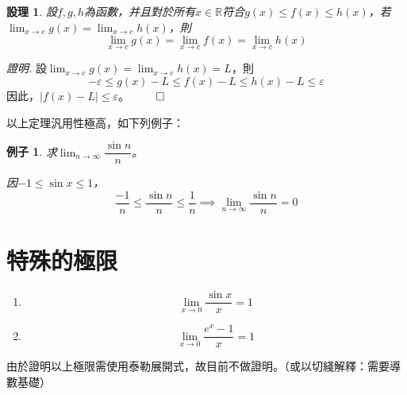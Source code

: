 \documentclass[12pt]{article}
\newtheorem*{proposition}{設理}
\newtheorem*{example}{例子}
\renewenvironment*{proof}{\textit{證明.}}{\hfill$\qed$}
\begin{document}
    \begin{proposition}
        設$f,g,h$為函數，并且對於所有$x\in\mathbb{R}$符合$g(x)\leq f(x)\leq h(x)$，若$\displaystyle \lim_{x\to c}g(x)=\lim_{x\to c}h(x)$，則$$\lim_{x\to c}g(x)=\lim_{x\to c}f(x)=\lim_{x\to c}h(x)$$
    \end{proposition}

    \begin{proof}
        設$\displaystyle \lim_{x\to c}g(x)=\lim_{x\to c}h(x)=L$，則$$-\varepsilon\leq g(x)-L\leq f(x)-L\leq h(x)-L\leq \varepsilon$$
        因此，$|f(x)-L|\leq \varepsilon$。
    \end{proof}

    以上定理汎用性極高，如下列例子：
    
    \begin{example}
        求$\lim_{n\to \infty}\dfrac{\sin{n}}{n}$。

        因$-1\leq \sin{x}\leq 1$，$$\frac{-1}{n}\leq \frac{\sin{n}}{n}\leq \frac{1}{n}\implies \lim_{n\to\infty}\frac{\sin{n}}{n}=0$$
    \end{example}
    \section*{特殊的極限}
    \begin{enumerate}
        \item $$\lim_{x\to 0}\frac{\sin{x}}{x}=1$$
        \item $$\lim_{x\to 0}\frac{e^{x}-1}{x}=1$$
    \end{enumerate}

    由於證明以上極限需使用泰勒展開式，故目前不做證明。（或以切綫解釋：需要導數基礎）
\end{document}
